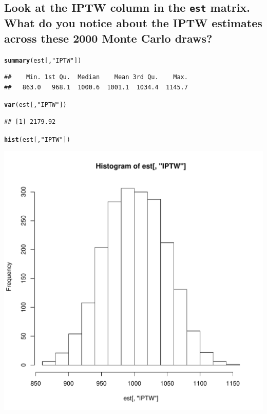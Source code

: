 \documentclass{article}\usepackage[]{graphicx}\usepackage[]{xcolor}
\makeatletter
\def\maxwidth{ %
  \ifdim\Gin@nat@width>\linewidth
    \linewidth
  \else
    \Gin@nat@width
  \fi
}
\newcommand{\hlstr}[1]{\textcolor[rgb]{0.192,0.494,0.8}{#1}}%
\newcommand{\hlstd}[1]{\textcolor[rgb]{0.345,0.345,0.345}{#1}}%
\newcommand{\hlkwd}[1]{\textcolor[rgb]{0.737,0.353,0.396}{\textbf{#1}}}%
\newenvironment{kframe}{%
 \def\at@end@of@kframe{}%
 \ifinner\ifhmode%
  \def\at@end@of@kframe{\end{minipage}}%
  \begin{minipage}{\columnwidth}%
 \fi\fi%
 \def\FrameCommand##1{\hskip\@totalleftmargin \hskip-\fboxsep
 \colorbox{shadecolor}{##1}\hskip-\fboxsep
     \hskip-\linewidth \hskip-\@totalleftmargin \hskip\columnwidth}%
 \MakeFramed {\advance\hsize-\width
   \@totalleftmargin\z@ \linewidth\hsize
   \@setminipage}}%
 {\par\unskip\endMakeFramed%
 \at@end@of@kframe}
\newenvironment{knitrout}{}{} %
\makeatother
\begin{document}
  \subsection{Look at the IPTW column in the \texttt{est} matrix. What do you notice about the IPTW estimates across these 2000 Monte Carlo draws?}
  
\begin{knitrout}
\color{fgcolor}\begin{kframe}
\begin{alltt}
\hlkwd{summary}\hlstd{(est[,}\hlstr{"IPTW"}\hlstd{])}
\end{alltt}
\begin{verbatim}
##    Min. 1st Qu.  Median    Mean 3rd Qu.    Max. 
##   863.0   968.1  1000.6  1001.1  1034.4  1145.7
\end{verbatim}
\begin{alltt}
\hlkwd{var}\hlstd{(est[,}\hlstr{"IPTW"}\hlstd{])}
\end{alltt}
\begin{verbatim}
## [1] 2179.92
\end{verbatim}
\begin{alltt}
\hlkwd{hist}\hlstd{(est[,}\hlstr{"IPTW"}\hlstd{])}
\end{alltt}
\end{kframe}
\includegraphics[width=\maxwidth]{figure/unnamed-chunk-21-1} 

\end{knitrout}
  
\end{document}
